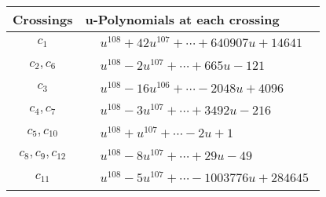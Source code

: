 \documentclass[1p]{elsarticle_modified}
\theoremstyle{definition}
\begin{document}
\begin{tabular}{m{50pt}|m{274pt}}
Crossings & \hspace{64pt}u-Polynomials at each crossing \\
\hline $$\begin{aligned}c_{1}\end{aligned}$$&$\begin{aligned}
&u^{108}+42 u^{107}+\cdots+640907 u+14641
\end{aligned}$\\
\hline $$\begin{aligned}c_{2},c_{6}\end{aligned}$$&$\begin{aligned}
&u^{108}-2 u^{107}+\cdots+665 u-121
\end{aligned}$\\
\hline $$\begin{aligned}c_{3}\end{aligned}$$&$\begin{aligned}
&u^{108}-16 u^{106}+\cdots-2048 u+4096
\end{aligned}$\\
\hline $$\begin{aligned}c_{4},c_{7}\end{aligned}$$&$\begin{aligned}
&u^{108}-3 u^{107}+\cdots+3492 u-216
\end{aligned}$\\
\hline $$\begin{aligned}c_{5},c_{10}\end{aligned}$$&$\begin{aligned}
&u^{108}+u^{107}+\cdots-2 u+1
\end{aligned}$\\
\hline $$\begin{aligned}c_{8},c_{9},c_{12}\end{aligned}$$&$\begin{aligned}
&u^{108}-8 u^{107}+\cdots+29 u-49
\end{aligned}$\\
\hline $$\begin{aligned}c_{11}\end{aligned}$$&$\begin{aligned}
&u^{108}-5 u^{107}+\cdots-1003776 u+284645
\end{aligned}$\\
\hline
\end{tabular}\\~\\
\end{document}
